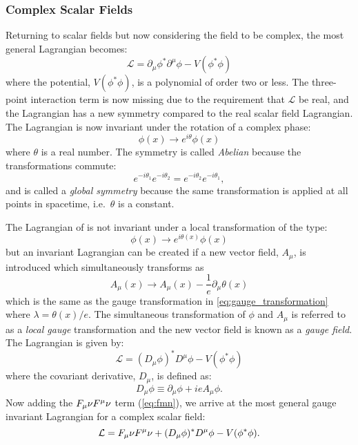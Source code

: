 \subsubsection{Complex Scalar Fields}
Returning to scalar fields but now considering the field to be complex, the most general Lagrangian becomes:
\begin{equation}
  \mathcal{L} = \partial_\mu \phi^* \partial^\mu \phi - V(\phi^*\phi)
  \label{eq:scalar_complex}
\end{equation}
where the potential, $V(\phi^*\phi)$, is a polynomial of order two or less. The three-point interaction term is now missing due to the requirement that $\mathcal{L}$ be real, and the Lagrangian has a new symmetry compared to the real scalar field Lagrangian. The Lagrangian is now invariant under the rotation of a complex phase:
\begin{equation}
  \phi(x) \to e^{i\theta}\phi(x)
\end{equation}
where $\theta$ is a real number. The symmetry is called \textit{Abelian} because the transformations commute:
\begin{equation}
  e^{-i\theta_1}e^{-i\theta_2} = e^{-i\theta_2}e^{-i\theta_1},
\end{equation}
and is called a \textit{global symmetry} because the same transformation is applied at all points in spacetime, i.e.\ $\theta$ is a constant. 

The Lagrangian of  is not invariant under a local transformation of the type:
\begin{equation}
  \phi(x) \to e^{i\theta(x)} \phi(x)
  \label{eq:local_transformation}
\end{equation}
but an invariant Lagrangian can be created if a new vector field, $A_\mu$, is introduced which simultaneously transforms as 
\begin{equation}
  A_\mu(x) \to A_\mu(x) - \frac{1}{e}\partial_\mu \theta(x)
  \label{eq:gauge_transformation_2}
\end{equation}
which is the same as the gauge transformation in \cref{eq:gauge_transformation} where $\lambda = \theta(x)/e$. The simultaneous transformation of $\phi$ and $A_\mu$ is referred to as a \textit{local gauge} transformation and the new vector field is known as a \textit{gauge field}. The Lagrangian is given by:
\begin{equation}
  \mathcal{L} = (D_\mu\phi)^* D^\mu \phi - V(\phi^*\phi)
  \label{eq:scalar_complex_gauge}
\end{equation}
where the covariant derivative, $D_\mu$, is defined as:
\begin{equation}
  D_\mu \phi \equiv \partial_\mu \phi + ieA_\mu \phi.
\end{equation}
Now adding the $F_\mu\nu F^\mu\nu$ term (\cref{eq:fmn}), we arrive at the most general gauge invariant Lagrangian for a complex scalar field:
\begin{equation}
  \mathcal{L} = F_\mu\nu F^\mu\nu + (D_\mu\phi)^* D^\mu \phi - V(\phi^*\phi) .
\end{equation}

